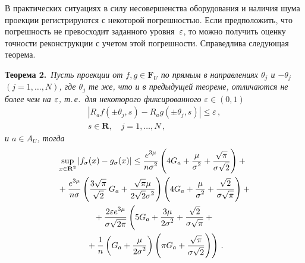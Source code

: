\begin{multicols}{2}
\medskip

В практических ситуациях в силу несовершенства оборудования и наличия шума проекции регистрируются с 
некоторой погрешностью. Если предположить, что погрешность не превосходит заданного уровня~$\varepsilon$, 
то можно получить оценку точности реконструкции с учетом этой погрешности. Справедлива следующая теорема.
\bigskip

\noindent
\textbf{Теорема 2.}\ \textit{Пусть проекции от $f,g\in\mathbf{F}_{U}$ по
прямым в направлениях $\theta_{j}$ и $-\theta_{j}$ $(j=1,\ldots,N)$, где
$\theta_{j}$ те же, что и в предыдущей теореме, отличаются не
более чем на $\varepsilon$, т.\,е.\ для некоторого фиксированного
$\varepsilon\in(0,1)$
\begin{multline*}
\left|R_{a}f(\pm\theta_j,s)-R_{a}g(\pm\theta_j,s)\right|\leq\varepsilon\,,\\
s\in\mathbf{R},\quad j=1,\ldots, N\,,
\end{multline*}
и $a\in A_U$, тогда
\begin{multline}
\!\!\sup_{x\in\mathbf{R}^{2}}\left|f_{\sigma}(x)-g_{\sigma}(x)\right|
\leq\fr{e^{3\mu}}{n\sigma^2}\left(4G_a+\fr{\mu}{\sigma^2}+
\fr{\sqrt{\pi}}{\sigma\sqrt{2}}\right)+{}\\
{}+\fr{e^{3\mu}}{n\sigma}\left(\fr{3\sqrt{\pi}}{\sqrt{2}}\,G_a+\fr{\sqrt{\pi}\mu}{2\sqrt{2}\sigma^2}\right)
\left(4G_a+\fr{\mu}{\sigma^2}+\fr{\sqrt{2}}{\sigma\sqrt{\pi}}\right)+{}\\
{}+\fr{2\eps e^{3\mu}}{\sigma\sqrt{2\pi}}\left(5G_a+\fr{3\mu}{2\sigma^2}+\fr{\sqrt{2}}{\sigma\sqrt{\pi}}+{}\right.\\
\left.{}+
\fr{1}{n}\left(G_a+\fr{\mu}{2\sigma^2}\right)\left(\pi G_a+\fr{\sqrt{\pi}}{\sigma\sqrt{2}}\right)\right)\,.
\label{e11sh}
\end{multline}
}
\bigskip


\end{multicols}
